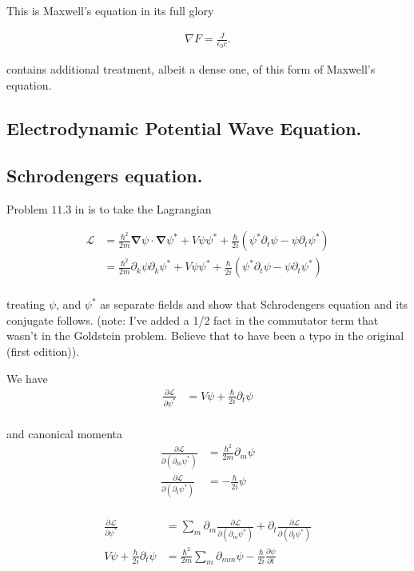 \documentclass{article}
\newcommand{\LL}[0]{\mathcal{L}}
\newcommand{\PD}[2]{\frac{\partial {#2}}{\partial {#1}}}
\newcommand{\grad}[0]{\nabla}
\newcommand{\conj}[0]{{*}}
\newcommand{\spacegrad}[0]{\boldsymbol{\nabla}}
\begin{document}
This is Maxwell's equation in its full glory

\begin{align}
\grad F = \frac{J}{\epsilon_0 c}.
\end{align}

\cite{doran2003gap} contains additional treatment, albeit a dense one, of 
this form of Maxwell's equation.

\subsection{ Electrodynamic Potential Wave Equation. }

\subsection{ Schrodengers equation. }

Problem $11.3$ in \cite{goldstein1951cm} is to take the Lagrangian

\begin{align*}
\LL 
&= \frac{\hbar^2}{2 m} \spacegrad \psi \cdot \spacegrad \psi^\conj + V \psi \psi^\conj + \frac{\hbar}{2i} ( \psi^\conj \partial_t \psi - \psi \partial_t \psi^\conj ) \\
&= \frac{\hbar^2}{2 m} \partial_k \psi \partial_k \psi^\conj + V \psi \psi^\conj + 
\frac{\hbar}{2i} ( \psi^\conj \partial_t \psi - \psi \partial_t \psi^\conj ) \\
\end{align*}

treating $\psi$, and $\psi^\conj$ as separate fields and show that Schrodengers equation and its conjugate follows.  (note: I've added a 1/2 fact in the
commutator term that wasn't in the Goldstein problem.  Believe that to have been a typo in the original (first edition)).

We have
\begin{align*}
\PD{\psi^\conj}{\LL} &= V\psi + \frac{\hbar}{2i} \partial_t \psi \\
\end{align*}

and canonical momenta
\begin{align*}
\PD{(\partial_m \psi^\conj)}{\LL} &= \frac{\hbar^2}{2 m} \partial_{m} \psi \\
\PD{(\partial_t \psi^\conj)}{\LL} &= -\frac{\hbar}{2i} {\psi} \\
\end{align*}

\begin{align*}
\PD{\psi^\conj}{\LL} &= \sum_m \partial_m \PD{(\partial_m \psi^\conj)}{\LL} + \partial_t \PD{(\partial_t \psi^\conj)}{\LL} \\
V\psi + \frac{\hbar}{2i} \partial_t \psi &= \frac{\hbar^2}{2 m} \sum_m \partial_{mm} \psi -\frac{\hbar}{2i} \PD{t}{\psi} \\
\end{align*}
\end{document}
